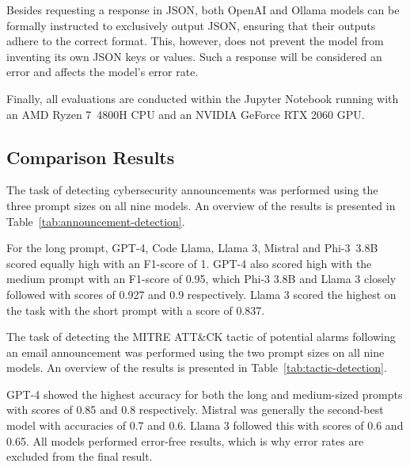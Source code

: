 Besides requesting a response in JSON, both OpenAI and Ollama models can be formally instructed to exclusively output
JSON, ensuring that their outputs adhere to the correct format.
This, however, does not prevent the model from inventing its own JSON keys or values.
Such a response will be considered an error and affects the model's error rate.

Finally, all evaluations are conducted within the Jupyter Notebook running with an AMD Ryzen 7\ 4800H CPU and an NVIDIA
GeForce RTX 2060 GPU\@.

\subsection{Comparison Results}
\label{subsec:rq3-comparison-results}

The task of detecting cybersecurity announcements was performed using the three prompt sizes on all nine models.
An overview of the results is presented in Table\ \ref{tab:announcement-detection}.



For the long prompt, GPT-4, Code Llama, Llama 3, Mistral and Phi-3\ 3.8B scored equally high with an F1-score of 1.
GPT-4 also scored high with the medium prompt with an F1-score of 0.95, which Phi-3 3.8B and Llama 3 closely followed
with scores of 0.927 and 0.9 respectively.
Llama 3 scored the highest on the task with the short prompt with a score of 0.837.

The task of detecting the MITRE ATT\&CK tactic of potential alarms following an email announcement was performed using
the two prompt sizes on all nine models.
An overview of the results is presented in Table\ \ref{tab:tactic-detection}.



GPT-4 showed the highest accuracy for both the long and medium-sized prompts with scores of 0.85 and 0.8 respectively.
Mistral was generally the second-best model with accuracies of 0.7 and 0.6.
Llama 3 followed this with scores of 0.6 and 0.65.
All models performed error-free results, which is why error rates are excluded from the final result.